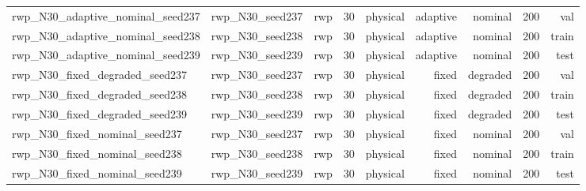 \begin{tabular}{lrrrrrrrr}
rwp\_N30\_adaptive\_nominal\_seed237 & rwp\_N30\_seed237 & rwp & 30 & physical & adaptive & nominal & 200 & val \\
rwp\_N30\_adaptive\_nominal\_seed238 & rwp\_N30\_seed238 & rwp & 30 & physical & adaptive & nominal & 200 & train \\
rwp\_N30\_adaptive\_nominal\_seed239 & rwp\_N30\_seed239 & rwp & 30 & physical & adaptive & nominal & 200 & test \\
rwp\_N30\_fixed\_degraded\_seed237 & rwp\_N30\_seed237 & rwp & 30 & physical & fixed & degraded & 200 & val \\
rwp\_N30\_fixed\_degraded\_seed238 & rwp\_N30\_seed238 & rwp & 30 & physical & fixed & degraded & 200 & train \\
rwp\_N30\_fixed\_degraded\_seed239 & rwp\_N30\_seed239 & rwp & 30 & physical & fixed & degraded & 200 & test \\
rwp\_N30\_fixed\_nominal\_seed237 & rwp\_N30\_seed237 & rwp & 30 & physical & fixed & nominal & 200 & val \\
rwp\_N30\_fixed\_nominal\_seed238 & rwp\_N30\_seed238 & rwp & 30 & physical & fixed & nominal & 200 & train \\
rwp\_N30\_fixed\_nominal\_seed239 & rwp\_N30\_seed239 & rwp & 30 & physical & fixed & nominal & 200 & test \\
\bottomrule
\end{tabular}